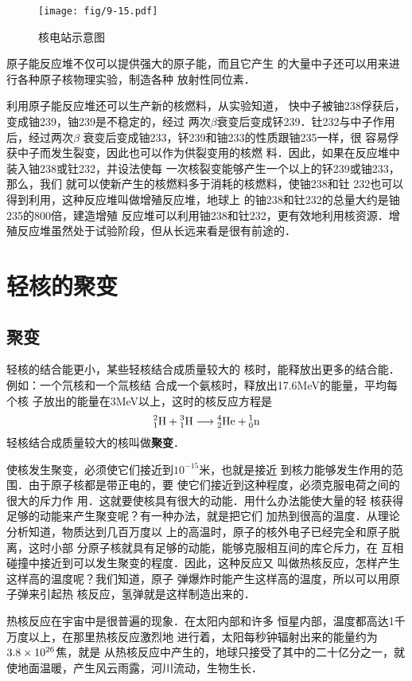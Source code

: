 \begin{figure}[htp]
    \centering
    \texttt{[image: fig/9-15.pdf]}
    \caption{核电站示意图}
\end{figure}

原子能反应堆不仅可以提供强大的原子能，而且它产生
的大量中子还可以用来进行各种原子核物理实验，制造各种
放射性同位素．

利用原子能反应堆还可以生产新的核燃料，从实验知道，
快中子被铀238俘获后，变成铀239，铀239是不稳定的，经过
两次$\beta$衰变后变成钚239．钍232与中子作用后，经过两次$\beta$
衰变后变成铀233，钚239和铀233的性质跟铀235一样，很
容易俘获中子而发生裂变，因此也可以作为供裂变用的核燃
料．因此，如果在反应堆中装入铀238或钍232，并设法使每
一次核裂变能够产生一个以上的钚239或铀233，那么，我们
就可以使新产生的核燃料多于消耗的核燃料，使铀238和钍
232也可以得到利用，这种反应堆叫做增殖反应堆，地球上
的铀238和钍232的总量大约是铀235的800倍，建造增殖
反应堆可以利用铀238和钍232，更有效地利用核资源．增
殖反应堆虽然处于试验阶段，但从长远来看是很有前途的．

\section{轻核的聚变}
\subsection{聚变}
轻核的结合能更小，某些轻核结合成质量较大的
核时，能释放出更多的结合能．例如：一个氘核和一个氚核结
合成一个氨核时，释放出17.6MeV的能量，平均每个核
子放出的能量在3MeV以上，这时的核反应方程是
\[\atom{H}{2}{1}+\atom{H}{3}{1}\longrightarrow \atom{He}{4}{2}+\atom{n}{1}{0} 
    \]
轻核结合成质量较大的核叫做\textbf{聚变}．

使核发生聚变，必须使它们接近到$10^{-15}$米，也就是接近
到核力能够发生作用的范围．由于原子核都是带正电的，要
使它们接近到这种程度，必须克服电荷之间的很大的斥力作
用．这就要使核具有很大的动能．用什么办法能使大量的轻
核获得足够的动能来产生聚变呢？有一种办法，就是把它们
加热到很高的温度．从理论分析知道，物质达到几百万度以
上的高温时，原子的核外电子已经完全和原子脱离，这时小部
分原子核就具有足够的动能，能够克服相互间的库仑斥力，在
互相碰撞中接近到可以发生聚变的程度．因此，这种反应又
叫做热核反应，怎样产生这样高的温度呢？我们知道，原子
弹爆炸时能产生这样高的温度，所以可以用原子弹来引起热
核反应，氢弹就是这样制造出来的．

热核反应在宇宙中是很普遍的现象．在太阳内部和许多
恒星内部，温度都高达1千万度以上，在那里热核反应激烈地
进行着，太阳每秒钟辐射出来的能量约为$3.8\x10^{26}$焦，就是
从热核反应中产生的，地球只接受了其中的二十亿分之一，就
使地面温暖，产生风云雨露，河川流动，生物生长．

